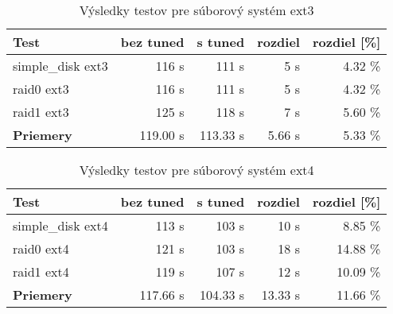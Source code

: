 \begin{table}[H]
\begin{center}
\begin{tabular}{|l|r|r|r|r|}
    \hline
    \textbf{Test} & \textbf{bez tuned} & \textbf{s tuned} & \textbf{rozdiel} & \textbf{rozdiel [\%]} \\ \hline
    simple\_disk ext3 & 116 s & 111 s & 5 s & 4.32 \% \\
    \hline
    raid0 ext3 & 116 s & 111 s & 5 s & 4.32 \% \\
    \hline
    raid1 ext3 & 125 s & 118 s & 7 s & 5.60 \% \\
    \hline
    \textbf{Priemery} & 119.00 s & 113.33 s & 5.66 s & 5.33 \% \\
    \hline
\end{tabular}
\caption{Výsledky testov pre súborový systém ext3}
\label{tab:results-ext3}
\end{center}
\end{table}

\begin{table}[H]
\begin{center}
\begin{tabular}{|l|r|r|r|r|}
    \hline
    \textbf{Test} & \textbf{bez tuned} & \textbf{s tuned} & \textbf{rozdiel} & \textbf{rozdiel [\%]} \\ \hline
    simple\_disk ext4 & 113 s & 103 s & 10 s & 8.85 \% \\
    \hline
    raid0 ext4 & 121 s & 103 s & 18 s & 14.88 \% \\
    \hline
    raid1 ext4 & 119 s & 107 s & 12 s & 10.09 \% \\
    \hline
    \textbf{Priemery} & 117.66 s & 104.33 s & 13.33 s & 11.66 \% \\
    \hline
\end{tabular}
\caption{Výsledky testov pre súborový systém ext4}
\label{tab:results-ext4}
\end{center}
\end{table}

%
%

